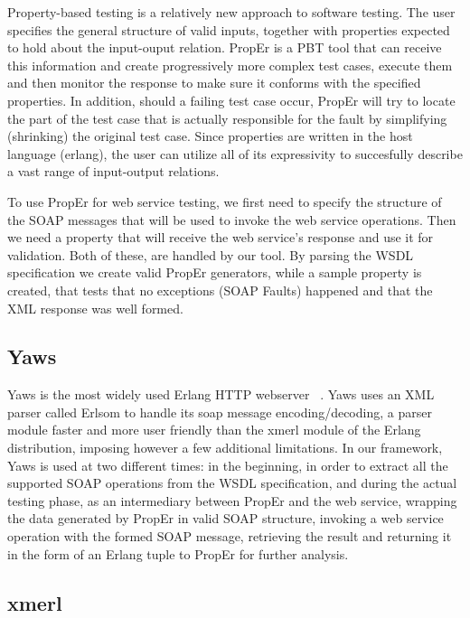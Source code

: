 \documentclass[submission,copyright,a4]{eptcs}
\begin{document}
Property-based testing is a relatively new approach to software testing. The
user specifies the general structure of valid inputs, together with properties
expected to hold about the input-ouput relation. PropEr is a PBT 
tool that can receive this information and create progressively more complex 
test cases, execute them and then monitor the response to make sure it 
conforms with the specified properties. In addition, should a failing test 
case occur, PropEr will try to locate the part of the test case that is 
actually responsible for the fault by
simplifying (shrinking) the original test case. Since properties are written 
in the host language (erlang), the user can utilize all of its expressivity to 
succesfully describe a vast range of input-output relations.

To use PropEr for web service testing, we first need to specify the structure
of the SOAP messages that will be used to invoke the web service operations. 
Then we need a property that will receive the web service's response and use 
it for validation. Both of these, are handled by our tool. By parsing the 
WSDL specification we create valid PropEr generators, while a sample property
is created, that tests that no exceptions (SOAP Faults) happened and that the 
XML response was well formed.


\subsection{Yaws}

Yaws is the most widely used Erlang HTTP webserver ~\cite{yaws}. Yaws uses an 
XML parser called Erlsom to handle its soap message encoding/decoding, a parser module 
faster and more user friendly than the xmerl module of the Erlang distribution, 
imposing however a few additional limitations. In our framework, Yaws is used 
at two different times: in the beginning, in order to extract all the supported 
SOAP operations from the WSDL specification, and during the actual testing phase, 
as an intermediary between PropEr and the web service, wrapping the data generated 
by PropEr in valid SOAP structure, invoking a web service operation with the 
formed SOAP message, retrieving the result and returning it in the form of an 
Erlang tuple to PropEr for further analysis.

\subsection{xmerl}
\end{document}
